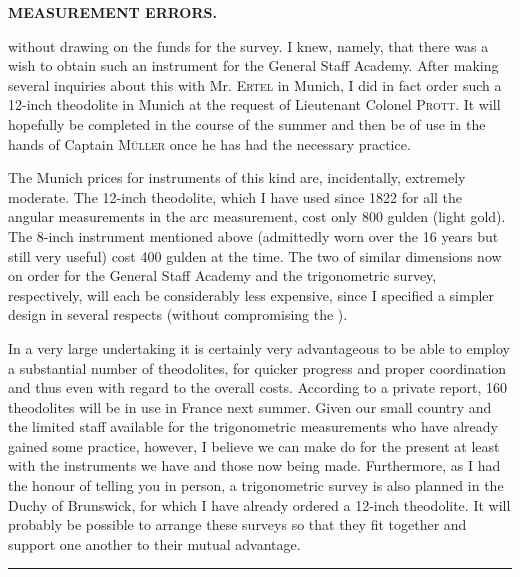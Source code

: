 \par\clearpage
\noindent\null\hfill{\small\textbf{MEASUREMENT ERRORS.}}\hfill{}\par\medskip
\noindent without drawing on the funds for the survey. I knew, namely, that there was a wish to obtain such an instrument for the General Staff Academy. After making several inquiries about this with Mr. \textsc{Ertel} in Munich, I did in fact order such a 12-inch theodolite in Munich at the request of Lieutenant Colonel \textsc{Prott}. It will hopefully be completed in the course of the summer and then be of use in the hands of Captain \textsc{Müller} once he has had the necessary practice.

\par\noindent\hspace*{\parindent}The Munich prices for instruments of this kind are, incidentally, extremely moderate. The 12-inch theodolite, which I have used since 1822 for all the angular measurements in the arc measurement, cost only 800 gulden (light gold). The 8-inch instrument mentioned above (admittedly  worn over the 16 years but still very useful) cost 400 gulden at the time. The two of similar dimensions now on order for the General Staff Academy and the trigonometric survey, respectively, will each be considerably less expensive, since I specified a simpler design in several respects (without compromising the ).

\par\noindent\hspace*{\parindent}In a very large undertaking it is certainly very advantageous to be able to employ a substantial number of theodolites, for quicker progress and proper coordination and thus even with regard to the overall costs. According to a private report, 160 theodolites will be in use in France next summer. Given our small country and the limited staff available for the trigonometric measurements who have already gained some practice, however, I believe we can make do for the present at least with the instruments we have and those now being made. Furthermore, as I had the honour of telling you in person, a trigonometric survey is also planned in the Duchy of Brunswick, for which I have already ordered a 12-inch theodolite. It will probably be possible to arrange these surveys so that they fit together and support one another to their mutual advantage.
\begin{center}\rule{3.5cm}{.4pt}\end{center}
\noindent{}\par

